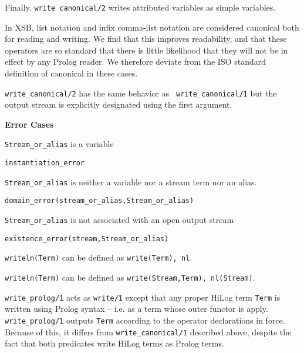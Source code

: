 \begin{description}
Finally, {\tt write canonical/2} writes attributed variables as simple
variables.

\compatibility
%
In XSB, list notation and infix comma-list notation are considered
canonical both for reading and writing.  We find that this improves
readability, and that these operators are so standard that there is
little likelihood that they will not be in effect by any Prolog
reader.  We therefore deviate from the ISO standard definition of
canonical in these cases.

%
{\tt write\_canonical/2} has the same behavior as {\tt
write\_canonical/1} but the output stream is explicitly designated
using the first argument.

{\bf Error Cases} 
\bi
\item 	{\tt Stream\_or\_alias} is a variable
\bi
\item {\tt instantiation\_error}
\ei
\item 	{\tt Stream\_or\_alias} is neither a variable nor a stream term nor an alias.
\bi
\item 	{\tt domain\_error(stream\_or\_alias,Stream\_or\_alias)}
\ei
\item 	{\tt Stream\_or\_alias} is not associated with an open output stream
\bi
\item 	{\tt existence\_error(stream,Stream\_or\_alias)}
\ei
\ei

    {\tt writeln(Term)} can be defined as {\tt write(Term), nl}.

    {\tt writeln(Term)} can be defined as {\tt write(Stream,Term),
    nl(Stream)}.


%
   {\tt write\_prolog/1} acts as {\tt write/1} except that any proper
   HiLog term {\tt Term} is written using Prolog syntax -- i.e. as a
   term whose outer functor is apply.  {\tt write\_prolog/1} outputs
   {\tt Term} according to the operator declarations in force.
   Because of this, it differs from {\tt write\_canonical/1} described
   above, despite the fact that both predicates write HiLog terms as
   Prolog terms.


\end{description}
